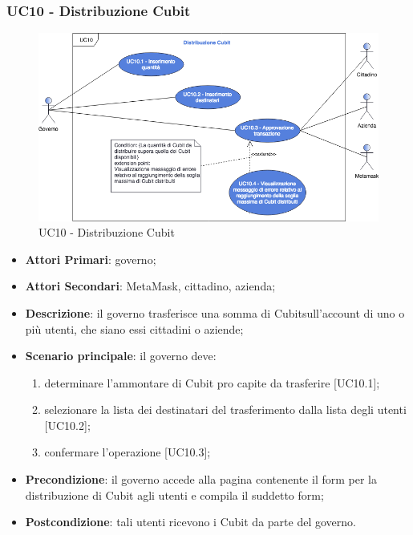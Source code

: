 \subsubsection{UC10 - Distribuzione Cubit}
\begin{figure}[h]
	\includegraphics[width=13.5cm]{res/images/UC10Distribuzione.png} %
	\centering
	\caption{UC10 - Distribuzione Cubit}
	
\end{figure}
\begin{itemize}
	\item \textbf{Attori Primari}: governo;
	\item \textbf{Attori Secondari}: MetaMask\glo, cittadino, azienda\glo;
	\item \textbf{Descrizione}: il governo trasferisce una somma di Cubit\glosp sull'account di uno o più  utenti, che siano essi cittadini o aziende;
	\item \textbf{Scenario principale}: il governo deve:
	 \begin{enumerate}[label=\alph*.]
		\item determinare l'ammontare di Cubit pro capite da trasferire [UC10.1];
		\item  selezionare la lista dei destinatari del trasferimento dalla lista degli utenti [UC10.2];
		\item confermare l'operazione [UC10.3];
	\end{enumerate}

	\item \textbf{Precondizione}: il governo accede alla pagina contenente il form per la distribuzione di Cubit agli utenti e compila il suddetto form;
	\item \textbf{Postcondizione}: tali utenti ricevono i Cubit da parte del governo.
\end{itemize}
